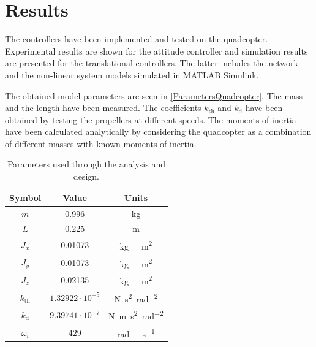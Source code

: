 \section{Results}\label{sec:results}
The controllers have been implemented and tested on the quadcopter. Experimental results are shown for the attitude controller and simulation results are presented for the translational controllers. The latter includes the network and the non-linear system models simulated in MATLAB Simulink.

The obtained model parameters are seen in \autoref{ParametersQuadcopter}. The mass and the length have been measured. The coefficients $k_{\mathrm{th}}$ and $k_{\mathrm{d}}$ have been obtained by testing the propellers at different speeds. The moments of inertia have been calculated analytically by considering the quadcopter as a combination of different masses with known moments of inertia.
\begin{table}[H]
    \centering
    \begin{tabular}{|c|c|c|}
    \hline
        \textbf{Symbol} &\textbf{Value} &\textbf{Units}\\
        \hline %
        $m$ & 0.996       &kg\\
        \hline %
        $L$  &   0.225       & m\\
        \hline %
        $J_x$  & 0.01073       & \si{kg \  m^2}\\
        \hline %
        $J_y$  & 0.01073       & \si{kg \  m^2}\\
        \hline %
        $J_z$  & 0.02135       & \si{kg \  m^2}\\
        \hline %
        $k_{\mathrm{th}}$  & $1.32922\cdot10^{-5}$       & \si{N s^2 rad^{-2}}\\
        \hline %
        $k_{\mathrm{d}}$  & $9.39741 \cdot10^{-7}$       & \si{N m s^2  rad^{-2}}\\
        \hline %
        $\overline{\omega}_i$& 429      & \si{rad \ s^{-1}}\\
        \hline
    \end{tabular}
    \caption{Parameters used through the analysis and design.}
    \label{ParametersQuadcopter}
\end{table}


